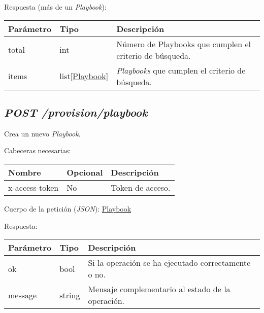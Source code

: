 		Respuesta (más de un \textit{Playbook}):
		\begin{table}[h!]
			\centering
	\begin{adjustbox}{max width=\textwidth}
			\begin{tabularx}{\linewidth}{|l|l|L|}
				\hline
				Parámetro & Tipo & Descripción \\ \hline
				total & int & Número de Playbooks que cumplen el criterio de búsqueda. \\ \hline
				items & list[\hyperref[sec:playbook]{Playbook}] & \textit{Playbooks} que cumplen el criterio de búsqueda. \\ \hline
			\end{tabularx}
\end{adjustbox}
		\end{table}
	
	
	
	\subsection{\textit{POST /provision/playbook}}
		Crea un nuevo \textit{Playbook}.
		
		Cabeceras necesarias:
		\begin{table}[h!]
			\centering
	\begin{adjustbox}{max width=\textwidth}
			\begin{tabular}{|l|l|l|}
				\hline
				Nombre & Opcional & Descripción \\ \hline
				x-access-token & No & Token de acceso. \\ \hline
			\end{tabular}
\end{adjustbox}
		\end{table}
		
		Cuerpo de la petición (\textit{JSON}): \hyperref[sec:playbook]{Playbook}
		
		\pagebreak
		Respuesta:
		\begin{table}[h!]
			\centering
	\begin{adjustbox}{max width=\textwidth}
			\begin{tabular}{|l|l|l|}
				\hline
				Parámetro & Tipo & Descripción \\ \hline
				ok & bool & Si la operación se ha ejecutado correctamente o no. \\ \hline
				message & string & Mensaje complementario al estado de la operación. \\ \hline
			\end{tabular}
\end{adjustbox}
	\end{table}
	
